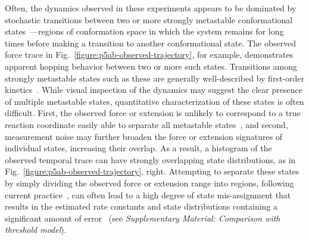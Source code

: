 \documentclass[aps,pre,twocolumn,superscriptaddress,nofootinbib,longbibliography]{revtex4-1}
\begin{document}
{Often, the dynamics observed in these experiments appears to be dominated by stochastic transitions between two or more strongly metastable conformational states~\cite{schuette-huisinga:2002:biomolecular-conformations-as-metastable-states,chodera-singhal:jcp:2007:automatic-state-decomposition}---regions of conformation space in which the system remains for long times before making a transition to another conformational state.
{\color{red}The observed force trace in Fig.~\ref{figure:p5ab-observed-trajectory}, for example, demonstrates apparent hopping behavior between two or more such states.}
{\color{red}Transitions among strongly metastable states such as these} are generally well-described by first-order kinetics~\cite{noe:pnas:2009:ww-domain}.
While visual inspection of the dynamics may suggest the clear presence of multiple metastable states, quantitative characterization of these states is often difficult.
First, the observed force or extension is unlikely to correspond to a true reaction coordinate easily able to separate all metastable states~\cite{best-paci-hummer-dudko:jpcb:2008:pulling-coordinate,rief-paci:pre:2010:multidimensional-landscape,thirumalai:2011:prl:pfold,chodera-pande:arxiv:2011:single-molecule-pfold}, and second, measurement noise may further broaden the force or extension signatures of individual states, increasing their overlap.
{\color{red} As a result, a histogram of the observed temporal trace can have strongly overlapping state distributions, as in Fig.~\ref{figure:p5ab-observed-trajectory}, right.}
Attempting to separate these states by simply dividing the observed force or extension range into regions, following current practice~\cite{woodside:science:2006:dna-hairpin-optical-trap,ritort:biophys-j:2011:short-handles}, can often lead to a high degree of state mis-assignment that results in the estimated rate constants and state distributions containing a significant amount of error~\cite{chodera:rate-theory,PrinzChoderaNoe_PRX14_RateTheory} (see \emph{Supplementary Material: Comparison with threshold model}).

}
\end{document}
